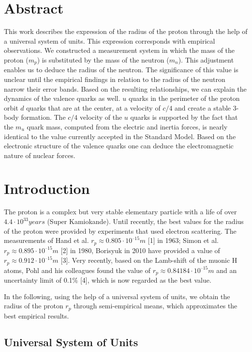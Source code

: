 \documentclass[11pt]{article}
\begin{document}
\section{Abstract}
This work describes the expression of the radius of the proton through the help of a universal system of units. This expression corresponds with empirical observations. We constructed a measurement system in which the mass of the proton ($m_p$) is substituted by the mass of the neutron ($m_n$). This adjustment enables us to deduce the radius of the neutron. The significance of this value is unclear until the empirical findings in relation to the radius of the neutron narrow their error bands. Based on the resulting relationships, we can explain the dynamics of the valence quarks as well. $u$ quarks in the perimeter of the proton orbit $d$ quarks that are at the center, at a velocity of $c/4$ and create a stable 3-body formation. The $c/4$ velocity of the $u$ quarks is supported by the fact that the $m_u$ quark mass, computed from the electric and inertia forces, is nearly identical to the value currently accepted in the Standard Model. Based on the electronic structure of the valence quarks one can deduce the electromagnetic nature of nuclear forces.

\section{Introduction}

The proton is a complex but very stable elementary particle with a life of over $4.4 \cdot 10^{33} years$ (Super Kamiokande). Until recently, the best values for the radius of the proton were provided by experiments that used electron scattering. The measurements of Hand et al. \( r_p\approx 0.805 \cdot 10^{–15}m \) [1] in 1963; Simon et al. \(r_p\approx 0.895 \cdot 10^{–15}m\) [2] in 1980, Borisyuk in 2010 have provided a value of \(r_p \approx 0.912 \cdot 10^{–15}m\) [3]. Very recently, based on the Lamb-shift of the muonic H atoms, Pohl and his colleagues found the value of \( r_p\approx 0.84184 \cdot 10^{–15}m\) and an uncertainty limit of 0.1\% [4], which is now regarded as the best value.

In the following, using the help of a universal system of units, we obtain the radius of the proton $r_p$ through semi-empirical means, which approximates the best empirical results. 

\subsection{Universal System of Units}
\end{document}
